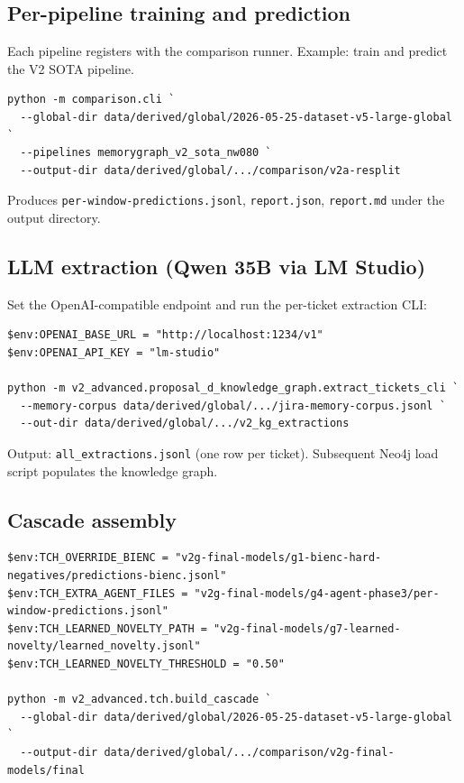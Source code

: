 \subsection{Per-pipeline training and prediction}

Each pipeline registers with the comparison runner. Example: train and predict the V2 SOTA pipeline.

\begin{lstlisting}[basicstyle=\ttfamily\footnotesize]
python -m comparison.cli `
  --global-dir data/derived/global/2026-05-25-dataset-v5-large-global `
  --pipelines memorygraph_v2_sota_nw080 `
  --output-dir data/derived/global/.../comparison/v2a-resplit
\end{lstlisting}

Produces \texttt{per-window-predictions.jsonl}, \texttt{report.json}, \texttt{report.md} under the output directory.

\subsection{LLM extraction (Qwen 35B via LM Studio)}

Set the OpenAI-compatible endpoint and run the per-ticket extraction CLI:

\begin{lstlisting}[basicstyle=\ttfamily\footnotesize]
$env:OPENAI_BASE_URL = "http://localhost:1234/v1"
$env:OPENAI_API_KEY = "lm-studio"

python -m v2_advanced.proposal_d_knowledge_graph.extract_tickets_cli `
  --memory-corpus data/derived/global/.../jira-memory-corpus.jsonl `
  --out-dir data/derived/global/.../v2_kg_extractions
\end{lstlisting}

Output: \texttt{all\_extractions.jsonl} (one row per ticket). Subsequent Neo4j load script populates the knowledge graph.

\subsection{Cascade assembly}

\begin{lstlisting}[basicstyle=\ttfamily\footnotesize]
$env:TCH_OVERRIDE_BIENC = "v2g-final-models/g1-bienc-hard-negatives/predictions-bienc.jsonl"
$env:TCH_EXTRA_AGENT_FILES = "v2g-final-models/g4-agent-phase3/per-window-predictions.jsonl"
$env:TCH_LEARNED_NOVELTY_PATH = "v2g-final-models/g7-learned-novelty/learned_novelty.jsonl"
$env:TCH_LEARNED_NOVELTY_THRESHOLD = "0.50"

python -m v2_advanced.tch.build_cascade `
  --global-dir data/derived/global/2026-05-25-dataset-v5-large-global `
  --output-dir data/derived/global/.../comparison/v2g-final-models/final
\end{lstlisting}

